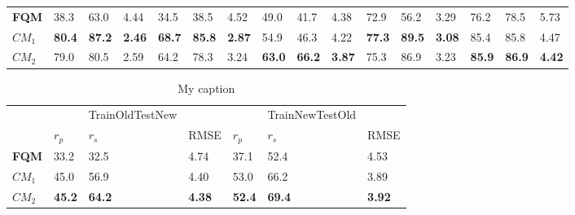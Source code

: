 \begin{table}[]
\begin{tabular}{llllllllllllllll}
\textbf{FQM}        & 38.3          & 63.0              & 4.44          & 34.5          & 38.5          & 4.52          & 49.0          & 41.7                          & 4.38          & 72.9          & 56.2               & 3.29          & 76.2          & 78.5           & 5.73          \\
$CM_1$                 & \textbf{80.4} & \textbf{87.2}     & \textbf{2.46} & \textbf{68.7} & \textbf{85.8} & \textbf{2.87} & 54.9          & 46.3                          & 4.22          & \textbf{77.3} & \textbf{89.5}      & \textbf{3.08} & 85.4          & 85.8           & 4.47          \\
$CM_2$                 & 79.0          & 80.5              & 2.59          & 64.2          & 78.3          & 3.24          & \textbf{63.0} & \textbf{66.2}                 & \textbf{3.87} & 75.3          & 86.9               & 3.23          & \textbf{85.9} & \textbf{86.9}  & \textbf{4.42}
\end{tabular}
\end{table}
\begin{table}[]
\centering
\caption{My caption}
\label{my-label}
\begin{tabular}{lllllll}
             &               & TrainOldTestNew &               &               & TrainNewTestOld &               \\
             & $r_p$                & $r_s$             & RMSE          & $r_p$                & $r_s$               & RMSE          \\
\textbf{FQM} & 33.2          & 32.5           & 4.74          & 37.1         & 52.4            & 4.53          \\
\textbf{$CM_1$} & 45.0         & 56.9            & 4.40          & 53.0          & 66.2            & 3.89          \\
\textbf{$CM_2$} & \textbf{45.2} & \textbf{64.2}   & \textbf{4.38} & \textbf{52.4} & \textbf{69.4}   & \textbf{3.92}
\end{tabular}
\end{table}